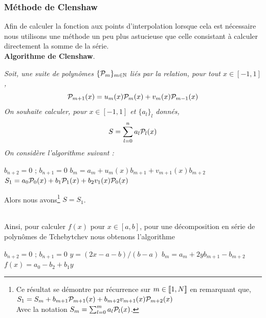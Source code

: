 \documentclass[10.5pt]{article}
\begin{document}
\begin{multicols*}{2}



\subsubsection{Méthode de Clenshaw}


Afin de calculer la fonction aux points d'interpolation lorsque cela est nécessaire nous utilisons une méthode un peu plus astucieuse que celle consistant à calculer directement la somme de la série. \\

\noindent
\textbf{Algorithme de Clenshaw}. {\itshape
Soit, une suite de polynômes $\{\mathcal{P}_m\}_{m \in \mathbb{N}}$ liés par la relation, pour tout $x \in [-1,1]$, 
\begin{equation}
 \mathcal{P}_{m+1}(x) = u_m(x)\mathcal{P}_m(x) + v_m(x)\mathcal{P}_{m-1}(x)
\end{equation}
On souhaite calculer, pour $x \in [-1, 1]$ et $\{a_l\}_l$ donnés, 
\begin{equation}
  S = \sum_{l=0}^{n} a_l \mathcal{P}_l(x)
\end{equation}
On considère l'algorithme suivant :
\vspace*{-11pt}
\begin{algorithm}[H]
  \begin{algorithmic}[1]
    \STATE $b_{n+2} = 0$ ; $b_{n+1} = 0$
    \STATE $b_m = a_m + u_m(x)b_{m+1} + v_{m+1}(x)b_{m+2}$
    \ENDFOR
    \STATE $S_1 = a_0\mathcal{P}_0(x) + b_1\mathcal{P}_1(x) + b_2v_1(x)\mathcal{P}_0(x)$
  \end{algorithmic}
\end{algorithm}
\vspace*{-11pt}
\noindent
Alors nous avons\footnote{Ce résultat se démontre par récurrence sur $m \in  \llbracket 1,N \rrbracket $ en remarquant que,
$S_1 = S_m +  b_{m+1}\mathcal{P}_{m+1}(x) + b_{m+2}v_{m+1}(x)\mathcal{P}_{m+2}(x)$\\
Avec la notation $S_m = \sum_{l=0}^{m} a_l \mathcal{P}_l(x)$.} $S = S_1$. 
} \\

Ainsi, pour calculer $f(x)$ pour $x \in [a,b]$, pour une décomposition en série de polynômes de Tchebytchev nous obtenons l'algorithme

\begin{algorithm}[H]
  \begin{algorithmic}[1]
    \STATE $b_{n+2} = 0$ ; $b_{n+1} = 0$
    \STATE $y = (2x-a-b)/(b-a)$
    \STATE $b_m = a_m + 2yb_{m+1} - b_{m+2}$
    \ENDFOR
    \STATE $f(x) = a_0 - b_2 + b_1y$
  \end{algorithmic}
\end{algorithm}


\end{multicols*}
\end{document}
